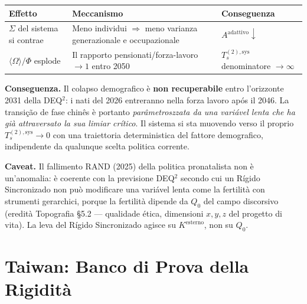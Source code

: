 {\def\LTcaptype{none} %
{\small\begin{longtable}[]{@{}
  >{\raggedright\arraybackslash}p{}
  >{\raggedright\arraybackslash}p{}
  >{\raggedright\arraybackslash}p{}@{}}
\toprule\noalign{}
\begin{minipage}[b]{\linewidth}\raggedright
Effetto
\end{minipage} & \begin{minipage}[b]{\linewidth}\raggedright
Meccanismo
\end{minipage} & \begin{minipage}[b]{\linewidth}\raggedright
Conseguenza
\end{minipage} \\
\midrule\noalign{}
\endhead
\bottomrule\noalign{}
\endlastfoot
\(\Sigma\) del sistema si contrae & Meno individui \(\Rightarrow\) meno
varianza generazionale e occupazionale &
\(A^{\text{adattivo}} \downarrow\) \\
\(\langle\Omega\rangle / \Phi\) esplode & Il rapporto
pensionati/forza-lavoro \(\to 1\) entro 2050 & \(T_s^{(2),\text{sys}}\)
denominatore \(\to \infty\) \\
\end{longtable}}
}

\Proved{} \textbf{Conseguenza.} Il colapso demografico è \textbf{non
recuperabile} entro l'orizzonte 2031 della DEQ$^2$: i nati del 2026
entreranno nella forza lavoro após il 2046. La transição de fase
chinês è portanto \emph{parâmetroszzata da una variável lenta che ha già
attraversato la sua limiar crítico}. Il sistema si sta muovendo verso il
proprio \(T_s^{(2),\text{sys}} \to 0\) con una traiettoria
deterministica del fattore demografico, indipendente da qualunque scelta
politica corrente.

\Conj{} \textbf{Caveat.} Il fallimento RAND (2025) della politica
pronatalista non è un'anomalia: è coerente con la previsione DEQ$^2$
secondo cui un Rígido Sincronizado non può modificare una variável
lenta come la fertilità con strumenti gerarchici, porque la fertilità
dipende da \(Q_0\) del campo discorsivo (eredità Topografia \S{}5.2 ---
qualidade ética, dimensioni \(x, y, z\) del progetto di vita). La leva del
Rígido Sincronizado agisce su \(K^{\text{esterno}}\), non su \(Q_0\).



\section{Taiwan: Banco di Prova della
Rigidità}\label{taiwan-banco-di-prova-della-rigidituxe0}

